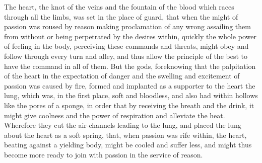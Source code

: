 The heart, the knot of the veins and the fountain of the blood which races
through all the limbs, was set in the place of guard, that when the might
of passion was roused by reason making proclamation of any wrong assailing
them from without or being perpetrated by the desires within, quickly the
whole power of feeling in the body, perceiving these commands and threats,
might obey and follow through every turn and alley, and thus allow the
principle of the best to have the command in all of them. But the gods,
foreknowing that the palpitation of the heart in the expectation of danger
and the swelling and excitement of passion was caused by fire, formed and
implanted as a supporter to the heart the lung, which was, in the first
place, soft and bloodless, and also had within hollows like the pores of a
sponge, in order that by receiving the breath and the drink, it might give
coolness and the power of respiration and alleviate the heat. Wherefore
they cut the air-channels leading to the lung, and placed the lung about
the heart as a soft spring, that, when passion was rife within, the heart,
beating against a yielding body, might be cooled and suffer less, and
might thus become more ready to join with passion in the service of
reason.

